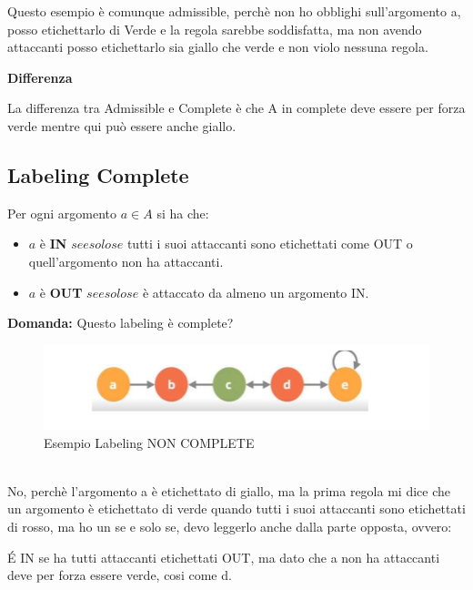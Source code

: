 Questo esempio è comunque admissible, perchè non ho obblighi sull’argomento a, posso etichettarlo di Verde e la regola sarebbe soddisfatta, ma non avendo attaccanti posso etichettarlo sia giallo che verde e non violo nessuna regola.
\begin{center}
    \textbf{Differenza}
\end{center}
La differenza tra Admissible e Complete è che A in complete deve essere per forza verde mentre qui può essere anche giallo.
\newpage
\subsection{Labeling Complete}
Per ogni argomento $a \in A$ si ha che:
\begin{itemize}
    \item  $a$ è \textbf{IN} $se e solo se$ tutti i suoi attaccanti sono etichettati come OUT o quell’argomento non ha attaccanti.
    \item $a$ è \textbf{OUT} $se e solo se$ è attaccato da almeno un argomento IN.
\end{itemize}
\textbf{Domanda: } Questo labeling è complete?
\begin{figure}[htp]
	\centering
    \includegraphics[width=12cm, keepaspectratio]{img/Cap7/LC.png}
    \caption{Esempio Labeling NON COMPLETE}
\end{figure}
\\No, perchè l’argomento a è etichettato di giallo, ma la prima regola mi dice che un argomento è etichettato di verde quando tutti i suoi attaccanti sono etichettati di rosso, ma ho un se e solo se, devo leggerlo anche dalla parte opposta, ovvero:

\vspace{0.3cm}

É IN se ha tutti attaccanti etichettati OUT, ma dato che a non ha attaccanti deve per forza essere verde, cosi come d.

\vspace{0.3cm}

